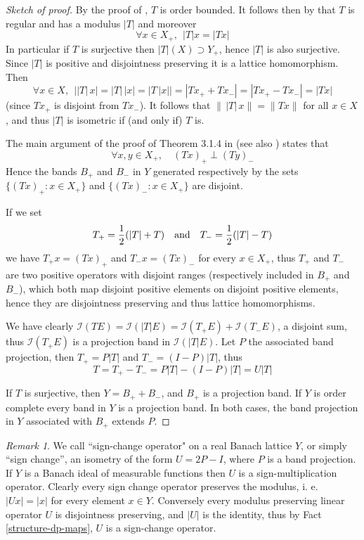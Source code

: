 \documentclass[11pt]{amsart}
\theoremstyle{plain}
\theoremstyle{remark}
\newtheorem{remark}[theorem]{Remark}
\newcommand{\I}{\mathcal I}
\begin{document}
\begin{proof}[Sketch of proof]
By  the proof of \cite[Theorem 3.1.5]{MN}, $T$ is order bounded. It follows then by  \cite[Theorem 3.1.4]{MN} that $T$ is regular and has a  modulus $|T|$  and moreover
$$\forall x\in X_+,\ \ |T|x=|Tx|$$
 In particular if $T$ is surjective then $|T|(X)\supset Y_+$, hence $|T|$ is also surjective. 
Since $|T|$ is positive and disjointness preserving it is a lattice homomorphism. Then
$$\forall x\in X,\ \ \big | |T|\,x\big |= |T|\,|x| =\big |T\,|x|\big |= |Tx_++Tx_-|=|Tx_+-Tx_-|=|Tx|$$
(since  $Tx_+$ is disjoint from $Tx_-$). It follows that $\|\,|T|\,x\|=\|Tx\|$ for all $x\in X$, and thus $|T|$ is  isometric if (and only if) $T$ is. 

The main argument of the proof of Theorem 3.1.4 in \cite{MN} (see also \cite[Lemma 2.39]{AB}) states that
$$\forall x,y\in X_+,\quad  (Tx)_+\perp (Ty)_-$$
Hence the bands $B_+$ and $B_-$ in $Y$ generated respectively  by the sets $\{(Tx)_+:x\in X_+\}$ and $\{(Tx)_-: x\in X_+\}$ are disjoint. 

If we set
\[T_+=\frac 12 (|T|+T) \quad\hbox{and}\quad T_-=\frac 12 (|T|-T)\]
we have $T_+x=(Tx)_+$ and $T_-x=(Tx)_-$ for every $x\in X_+$, thus $T_+$ and $T_-$ are two positive operators with disjoint ranges (respectively included in $B_+$ and $B_-$), which both map disjoint positive elements on disjoint positive elements, hence they  are disjointness preserving and thus lattice homomorphisms.

We have clearly $\I(TE)=\I(|T|E)=\I(T_+E)+\I(T_-E)$, a disjoint sum, thus  $\I(T_+E)$ is a projection band in $\I(|T|E)$.  Let $P$ the associated band projection, then $T_+=P|T|$ and $T_-=(I-P)|T|$, thus
\[ T=T_+-T_- =P|T|-(I-P)|T|=U|T|\]

If $T$ is surjective, then $Y=B_++B_-$, and $B_+$ is a projection band. If $Y$ is order complete every band in $Y$ is a projection band. In both cases,  the band projection in $Y$ associated with $B_+$ extends $P$.
\end{proof}

\begin {remark} We call ``sign-change operator" on a real Banach lattice $Y$, or simply ``sign change'',  an isometry of the form $U=2P-I$, where $P$ is a band projection.  If $Y$ is a Banach ideal of measurable functions then $U$ is a sign-multiplication operator. Clearly every sign change operator preserves the modulus, i. e. $|Ux|=|x|$ for every element $x\in Y$. Conversely every modulus preserving linear operator $U$ is disjointness  preserving, and $|U|$ is the identity, thus by Fact \ref {structure-dp-maps}, $U$ is a sign-change operator.
\end{remark}
\end{document}
